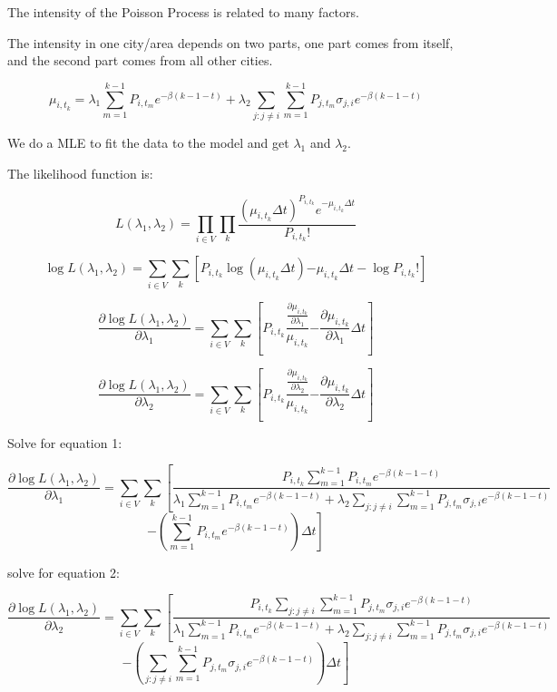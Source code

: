 \documentclass[12pt]{article}
\begin{document}
The intensity of the Poisson Process is related to many factors. 

The intensity in one city/area depends on two parts, one part comes from itself, and the second part comes from all other cities. 




$$\mu_{i,t_k} = \lambda_1 \sum_{m = 1}^{ k-1} P_{i,t_m} e^{-\beta(k-1-t)} + \lambda_2 \sum_{j:j\neq i} \sum_{m = 1}^{ k-1} P_{j,t_m} \sigma_{j,i} e^{-\beta(k-1-t)}$$

We do a MLE to fit the data to the model and get $\lambda_1$ and $\lambda_2$.

The likelihood function is:

$$L(\lambda_1, \lambda_2) = \prod_{i \in V} \prod_{k} \frac{(\mu_{i,t_k}\Delta t)^{P_{i,t_k}} e^{-\mu_{i,t_k}\Delta t}}{P_{i,t_k}!}
$$


$$
\log L(\lambda_1, \lambda_2) = \sum_{i \in V} \sum_{k}\left[ {P_{i,t_k} \log{(\mu_{i,t_k}\Delta t)} {-\mu_{i,t_k}\Delta t}} - \log{P_{i,t_k}!} \right]
$$


$$
\frac{\partial \log L(\lambda_1, \lambda_2)}{\partial \lambda_1} = \sum_{i \in V} \sum_{k}\left[ {P_{i,t_k} \frac{ \frac{\partial \mu_{i,t_k}}{\partial \lambda_1}}{\mu_{i,t_k}} {- \frac{\partial \mu_{i,t_k}}{\partial \lambda_1}\Delta t}} \right] 
$$


$$
\frac{\partial \log L(\lambda_1, \lambda_2)}{\partial \lambda_2} = \sum_{i \in V} \sum_{k}\left[ {P_{i,t_k} \frac{ \frac{\partial \mu_{i,t_k}}{\partial \lambda_2}}{\mu_{i,t_k}} {- \frac{\partial \mu_{i,t_k}}{\partial \lambda_2}\Delta t}} \right] 
$$

Solve for equation 1:

$$
\frac{\partial \log L(\lambda_1, \lambda_2)}{\partial \lambda_1} = \sum_{i \in V} \sum_{k}\left[ { \frac{P_{i,t_k}\sum_{m = 1}^{ k-1} P_{i,t_m} e^{-\beta(k-1-t)}}{ \lambda_1 \sum_{m = 1}^{ k-1} P_{i,t_m} e^{-\beta(k-1-t)} + \lambda_2 \sum_{j:j\neq i} \sum_{m = 1}^{ k-1} P_{j,t_m} \sigma_{j,i} e^{-\beta(k-1-t)}}} \right.
$$
$$
\left. {- \left( \sum_{m = 1}^{ k-1} P_{i,t_m} e^{-\beta(k-1-t)} \right)\Delta t} \right] 
$$

solve for equation 2:

$$
\frac{\partial \log L(\lambda_1, \lambda_2)}{\partial \lambda_2} = \sum_{i \in V} \sum_{k}\left[ { \frac{P_{i,t_k}\sum_{j:j\neq i} \sum_{m = 1}^{ k-1} P_{j,t_m} \sigma_{j,i} e^{-\beta(k-1-t)} }{ \lambda_1 \sum_{m = 1}^{ k-1} P_{i,t_m} e^{-\beta(k-1-t)} + \lambda_2 \sum_{j:j\neq i} \sum_{m = 1}^{ k-1} P_{j,t_m} \sigma_{j,i} e^{-\beta(k-1-t)}}} \right.
$$
$$
\left. {- \left( \sum_{j:j\neq i} \sum_{m = 1}^{ k-1} P_{j,t_m} \sigma_{j,i} e^{-\beta(k-1-t)} \right)\Delta t} \right] 
$$
\end{document}
